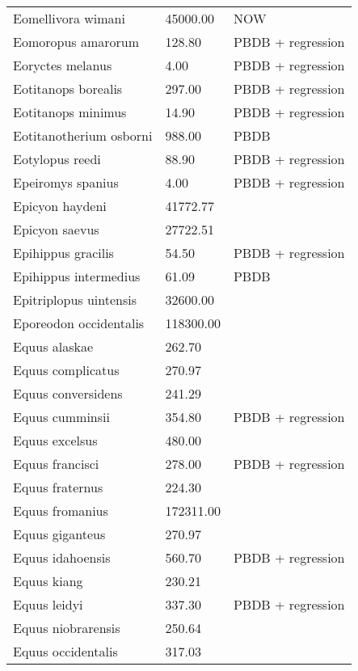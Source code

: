 \begin{longtable}{p{} p{} p{}}
    Eomellivora wimani & 45000.00 & NOW \\ 
    Eomoropus amarorum & 128.80 & PBDB + regression \\ 
    Eoryctes melanus & 4.00 & PBDB + regression \\ 
    Eotitanops borealis & 297.00 & PBDB + regression \\ 
    Eotitanops minimus & 14.90 & PBDB + regression \\ 
    Eotitanotherium osborni & 988.00 & PBDB \\ 
    Eotylopus reedi & 88.90 & PBDB + regression \\ 
    Epeiromys spanius & 4.00 & PBDB + regression \\ 
    Epicyon haydeni & 41772.77 & \cite{Tomiya2013} \\ 
    Epicyon saevus & 27722.51 & \cite{Tomiya2013} \\ 
    Epihippus gracilis & 54.50 & PBDB + regression \\ 
    Epihippus intermedius & 61.09 & PBDB \\ 
    Epitriplopus uintensis & 32600.00 & \cite{MacFadden1986} \\ 
    Eporeodon occidentalis & 118300.00 & \cite{McKenna2011} \\ 
    Equus alaskae & 262.70 & \cite{Smith2004} \\ 
    Equus complicatus & 270.97 & \cite{Smith2004} \\ 
    Equus conversidens & 241.29 & \cite{Smith2004} \\ 
    Equus cumminsii & 354.80 & PBDB + regression \\ 
    Equus excelsus & 480.00 & \cite{Silcox2012} \\ 
    Equus francisci & 278.00 & PBDB + regression \\ 
    Equus fraternus & 224.30 & \cite{Smith2004} \\ 
    Equus fromanius & 172311.00 & \cite{McKenna2011} \\ 
    Equus giganteus & 270.97 & \cite{Smith2004} \\ 
    Equus idahoensis & 560.70 & PBDB + regression \\ 
    Equus kiang & 230.21 & \cite{Smith2004} \\ 
    Equus leidyi & 337.30 & PBDB + regression \\ 
    Equus niobrarensis & 250.64 & \cite{Smith2004} \\ 
    Equus occidentalis & 317.03 & \cite{Smith2004} \\ 

\end{longtable}
